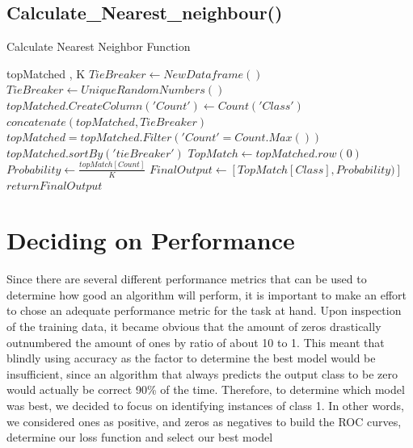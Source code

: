 \documentclass{article}
\begin{document}
 \subsection{Calculate\_Nearest\_neighbour()}
 
\begin{algorithm}[H]
\caption{Calculate Nearest Neighbor Function}
\begin{algorithmic}[1]
\REQUIRE topMatched , K 
	\STATE $TieBreaker \gets NewDataframe()$
	\STATE $TieBreaker \gets UniqueRandomNumbers()$
	\STATE $topMatched.CreateColumn('Count') \gets Count('Class')$
	\STATE $concatenate(topMatched, TieBreaker)$
	\STATE $topMatched = topMatched.Filter( 'Count' = Count.Max())$
	\STATE $topMatched.sortBy('tieBreaker')$
	\STATE $TopMatch \gets topMatched.row(0) $ 
	\STATE $Probability \gets \frac{topMatch[Count]}{ K}$
	\STATE $ FinalOutput \gets [TopMatch[Class], Probability)] $ 
    \STATE $return FinalOutput$
       
\end{algorithmic}
\end{algorithm}



\section{Deciding on Performance}  

Since there are several different performance metrics that can be used to determine how good an algorithm will perform, it is important to make an effort to chose an adequate performance metric for the task at hand. Upon inspection of the training data, it became obvious that the amount of zeros drastically outnumbered the amount of ones by ratio of about 10 to 1. This meant that blindly using accuracy as the factor to determine the best model would be insufficient, since an algorithm that always predicts the output class to be zero would actually be correct 90\% of the time. Therefore, to determine which model was best, we decided to focus on identifying instances of class 1. In other words, we considered ones as positive, and zeros as negatives to build the ROC curves, determine our loss function and select our best model \\
\end{document}
